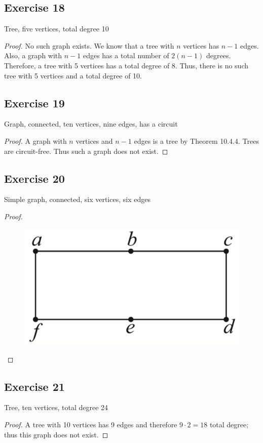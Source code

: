 \documentclass[14pt]{extarticle}
\begin{document}
\subsection{Exercise 18}
Tree, five vertices, total degree 10

    {\it Proof.} No such graph exists. We know that a tree with \(n\) vertices has \(n-1\) edges. Also, a graph with \(n-1\) edges has a total number of \(2(n-1)\) degrees. Therefore, a tree with 5 vertices has a total degree of 8. Thus, there is no such tree with 5 vertices and a total degree of 10.

\subsection{Exercise 19}
Graph, connected, ten vertices, nine edges, has a circuit
\begin{proof}
    A graph with \(n\) vertices and \(n-1\) edges is a tree by Theorem 10.4.4. Trees are circuit-free. Thus such a graph does
    not exist.
\end{proof}

\subsection{Exercise 20}
Simple graph, connected, six vertices, six edges
\begin{proof}
    \begin{figure}[ht!]
        \centering
        \includegraphics[scale=0.15]{../images/10.4.20.png}
    \end{figure}
\end{proof}

\subsection{Exercise 21}
Tree, ten vertices, total degree 24
\begin{proof}
    A tree with 10 vertices has 9 edges and therefore \(9 \cdot 2 = 18\) total degree; thus this graph does not exist.
\end{proof}
\end{document}

